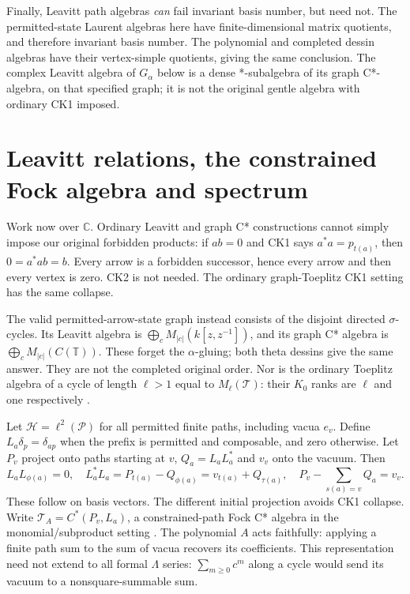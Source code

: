 \documentclass[11pt]{article}
\theoremstyle{definition}\newtheorem{definition}[theorem]{Definition}
\theoremstyle{remark}\newtheorem{remark}[theorem]{Remark}
\newcommand{\C}{\mathbb C}\newcommand{\Z}{\mathbb Z}\newcommand{\R}{\mathbb R}
\begin{document}
Finally, Leavitt path algebras \emph{can} fail invariant basis number, but need not. The permitted-state Laurent algebras here have finite-dimensional matrix quotients, and therefore invariant basis number. The polynomial and completed dessin algebras have their vertex-simple quotients, giving the same conclusion. The complex Leavitt algebra of $G_\alpha$ below is a dense *-subalgebra of its graph C*-algebra, on that specified graph; it is not the original gentle algebra with ordinary CK1 imposed.


\section{Leavitt relations, the constrained Fock algebra and spectrum}
Work now over $\C$. Ordinary Leavitt and graph C* constructions \cite{AbramsArandaPino,BPRS} cannot simply impose our original forbidden products: if $ab=0$ and CK1 says $a^*a=p_{t(a)}$, then $0=a^*ab=b$. Every arrow is a forbidden successor, hence every arrow and then every vertex is zero. CK2 is not needed. The ordinary graph-Toeplitz CK1 setting has the same collapse.

The valid permitted-arrow-state graph instead consists of the disjoint directed $\sigma$-cycles. Its Leavitt algebra is $\bigoplus_cM_{|c|}(k[z,z^{-1}])$, and its graph C* algebra is $\bigoplus_cM_{|c|}(C(\mathbb T))$. These forget the $\alpha$-gluing; both theta dessins give the same answer. They are not the completed original order. Nor is the ordinary Toeplitz algebra of a cycle of length $\ell>1$ equal to $M_\ell(\mathcal T)$: their $K_0$ ranks are $\ell$ and one respectively \cite{BrownloweLacaRobertsonSims}.

Let $\mathcal H=\ell^2(\mathcal P)$ for all permitted finite paths, including vacua $e_v$. Define $L_a\delta_p=\delta_{ap}$ when the prefix is permitted and composable, and zero otherwise. Let $P_v$ project onto paths starting at $v$, $Q_a=L_aL_a^*$ and $v_v$ onto the vacuum. Then
\[
 L_aL_{\phi(a)}=0,\quad
 L_a^*L_a=P_{t(a)}-Q_{\phi(a)}=v_{t(a)}+Q_{\tau(a)},\quad
 P_v-\sum_{s(a)=v}Q_a=v_v.
\]
These follow on basis vectors. The different initial projection avoids CK1 collapse. Write $\mathcal T_A=C^*(P_v,L_a)$, a constrained-path Fock C* algebra in the monomial/subproduct setting \cite{KakariadisShalit,ShalitSolel}. The polynomial $A$ acts faithfully: applying a finite path sum to the sum of vacua recovers its coefficients. This representation need not extend to all formal $\Lambda$ series: $\sum_{m\ge0}c^m$ along a cycle would send its vacuum to a nonsquare-summable sum.
\end{document}
